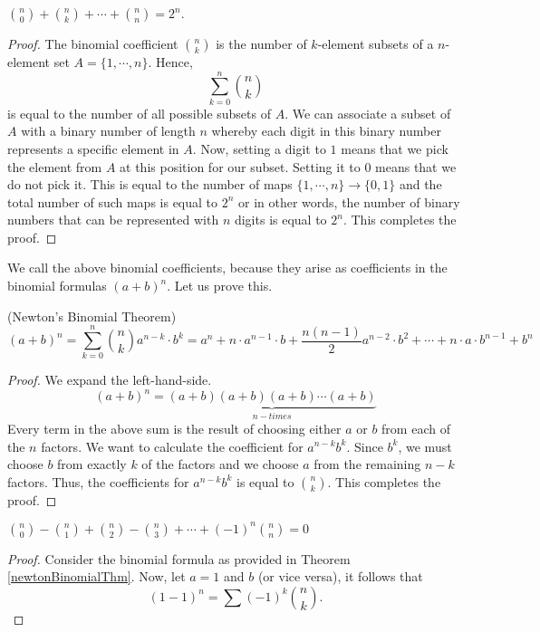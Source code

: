 \begin{proposition}
$\displaystyle {n \choose 0} + {n \choose k} + \cdots + {n \choose n}=2^n.$
\label{propositionPascalTriangle}
\end{proposition}

\begin{proof}
The binomial coefficient ${n \choose k}$ is the number of $k$-element subsets of a $n$-element set $A=\{1, \cdots, n\}$. Hence,
$$
\sum_{k=0}^n {n \choose k}
$$
is equal to the number of all possible subsets of $A$. We can associate a subset of $A$ with a binary number of length $n$ 
whereby each digit in this binary number represents a specific element in $A$. Now, setting a digit to $1$ means that we pick the element from $A$ at this position
for our subset. Setting it to $0$ means that we do not pick it. This is equal to the number of maps $\{1, \cdots, n\} \to \{0,1\}$ and the total number of such maps is equal to $2^n$ or in other words, the number of binary numbers that
can be represented with $n$ digits is equal to $2^n$. This completes the proof.
\end{proof}

We call the above binomial coefficients, because they arise as coefficients in the binomial formulas $(a+b)^n$. Let us prove this.

\begin{theorem}(Newton's Binomial Theorem)
$$
(a+b)^n = \sum_{k=0}^n {n \choose k} a^{n-k} \cdot b^k=a^n+n \cdot a^{n-1} \cdot b+ \frac{n(n-1)}{2} a^{n-2} \cdot b^2+ \cdots + n \cdot a \cdot b^{n-1}+b^n
$$
\label{newtonBinomialThm}
\end{theorem}

\begin{proof}
We expand the left-hand-side.
$$
(a+b)^n=\underbrace{(a+b)(a+b)(a+b)\cdots (a+b)}_{n-times}
$$
Every term in the above sum is the result of choosing either $a$ or $b$ from each of the $n$ factors. We want to calculate the coefficient for $a^{n-k}b^k$.
Since $b^k$, we must choose $b$ from exactly $k$ of the factors and we choose $a$ from the remaining $n-k$ factors.
Thus, the coefficients for $a^{n-k}b^k$ is equal to ${n \choose k}$. This completes the proof.
\end{proof}

\begin{corolarry}
$\displaystyle {n \choose 0}- {n \choose 1} + {n \choose 2} - {n \choose 3} + \cdots + (-1)^n {n \choose n}=0$
\end{corolarry}

\begin{proof}
Consider the binomial formula as provided in Theorem \ref{newtonBinomialThm}. Now, let $a=1$ and $b$ (or vice versa), it follows that 
$$
(1-1)^n= \sum (-1)^k {n \choose k}.
$$
\end{proof}

